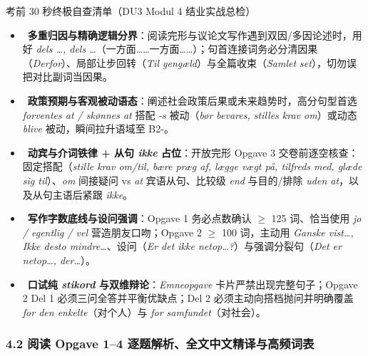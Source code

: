 \begin{tipbox}{考前 30 秒终极自查清单（DU3 Modul 4 结业实战总检）}
\small
\begin{itemize}
  \item {}\ \textbf{多重归因与精确逻辑分界}：阅读完形与议论文写作遇到双因/多因论述时，用好 \textit{dels \ldots, dels \ldots}（一方面……一方面……）；句首连接词务必分清因果（\textit{Derfor}）、局部让步回转（\textit{Til gengæld}）与全篇收束（\textit{Samlet set}），切勿误把对比副词当因果。
  \item {}\ \textbf{政策预期与客观被动语态}：阐述社会政策后果或未来趋势时，高分句型首选 \textit{forventes at / skønnes at} 搭配 \textit{-s} 被动（\textit{bør bevares, stilles krav om}）或动态 \textit{blive} 被动，瞬间拉升语域至 B2-。
  \item {}\ \textbf{动宾与介词铁律 + 从句 \textit{ikke} 占位}：开放完形 Opgave 3 交卷前逐空核查：固定搭配（\textit{stille krav om/til, bære præg af, lægge vægt på, tilfreds med, glæde sig til}）、\textit{om} 间接疑问 vs \textit{at} 宾语从句、比较级 \textit{end} 与目的/排除 \textit{uden at}，以及从句主语后紧跟 \textit{ikke}。
  \item {}\ \textbf{写作字数底线与设问强调}：Opgave 1 务必点数确认 $\ge$ 125 词、恰当使用 \textit{jo / egentlig / vel} 营造朋友口吻；Opgave 2 $\ge$ 100 词，主动用 \textit{Ganske vist\ldots, Ikke desto mindre\ldots}、设问（\textit{Er det ikke netop\ldots?}）与强调分裂句（\textit{Det er netop\ldots, der\ldots}）。
  \item {}\ \textbf{口试纯 \textit{stikord} 与双维辩论}：\textit{Emneopgave} 卡片严禁出现完整句子；Opgave 2 Del 1 必须三问全答并平衡优缺点；Del 2 必须主动向搭档抛问并明确覆盖 \textit{for den enkelte}（对个人）与 \textit{for samfundet}（对社会）。
\end{itemize}
\end{tipbox}

\subsubsection*{4.2 阅读 Opgave 1--4 逐题解析、全文中文精译与高频词表}

